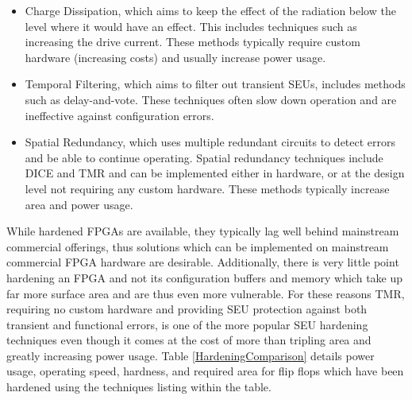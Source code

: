 \documentclass[12pt,final,oneside]{dwThesis} %
\begin{document}
   \begin{itemize}

      \item Charge Dissipation, which aims to keep the effect of the radiation
         below the level where it would have an effect. This includes
         techniques such as increasing the drive current. These methods
         typically require custom hardware (increasing costs) and usually
         increase power usage.
      \item Temporal Filtering, which aims to filter out transient \glspl{SEU},
         includes methods such as delay-and-vote\cite{HardeningTechniques}.
         These techniques often slow down operation and are ineffective
         against configuration errors.
      \item Spatial Redundancy, which uses multiple redundant circuits to
         detect errors and be able to continue operating. Spatial redundancy
         techniques include \gls{DICE}\cite{DICE} and \gls{TMR} and can be
         implemented either in hardware, or at the design level not
         requiring any custom hardware. These methods typically increase
         area and power usage.  
   \end{itemize}
   While hardened \glspl{FPGA}
   are available, they typically lag well behind mainstream commercial
   offerings\cite{VFPGATMR}, thus solutions which can be implemented on
   mainstream commercial \gls{FPGA} hardware are desirable. Additionally,
   there is very little point hardening an \gls{FPGA} and not its
   configuration buffers and memory which take up far more surface
   area\cite{FPGAArch} and are thus even more vulnerable.  For these reasons
   \gls{TMR}, requiring no custom hardware and providing \gls{SEU}
   protection against both transient and functional errors, is one of the
   more popular \gls{SEU} hardening techniques even though it comes at the
   cost of more than tripling area and greatly increasing power usage.
   Table \ref{HardeningComparison} details power usage, operating speed,
   hardness, and required area for flip flops which have been hardened using
   the techniques listing within the table.  
\end{document}
